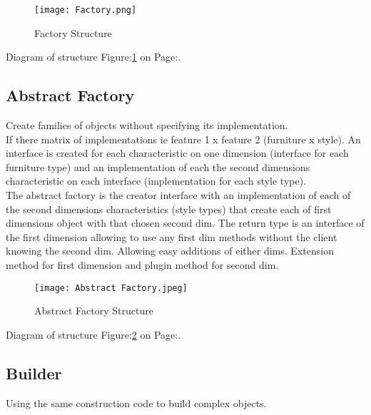\documentclass[11pt]{scrartcl} %
\begin{document}
\begin{figure}[h] %
	\centering
	\texttt{[image: Factory.png]} %
	\caption{Factory Structure}
	\label{Factory Structure}
\end{figure}

Diagram of structure Figure:\ref{Factory Structure} on Page:\pageref{Factory Structure}.

\subsection{Abstract Factory}

Create families of objects without specifying its implementation.\\

If there matrix of implementations ie feature 1 x feature 2 (furniture x style). An interface is created for each
characteristic on one dimension (interface for each furniture type) and an implementation of each the 
second dimensions characteristic on each interface (implementation for each style type).\\

The abstract factory is the creator interface with an implementation of each of the second dimensions characteristics
(style types) that create each of first dimensions object with that chosen second dim. The return type is an interface of 
the first dimension allowing to use any first dim methods without the client knowing the second dim.
Allowing easy additions of either dims. Extension method for first dimension and plugin method for second dim.\\

\begin{figure}[h] %
	\centering
	\texttt{[image: Abstract Factory.jpeg]} %
	\caption{Abstract Factory Structure}
	\label{Abstract Factory Structure}
\end{figure}

Diagram of structure Figure:\ref{Abstract Factory Structure} on Page:\pageref{Abstract Factory Structure}.

\subsection{Builder}

Using the same construction code to build complex objects.\\
\end{document}
